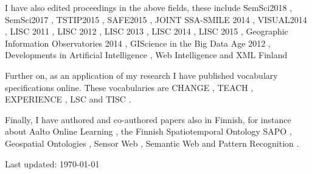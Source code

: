 \documentclass[11pt,letterpaper]{article}
\begin{document}
I have also edited proceedings in the above fields, these include SemSci2018 \cite{semsci2018},
SemSci2017 \cite{semsci2017}, TSTIP2015 \cite{tstip2015,tstip2015intro}, SAFE2015
\cite{safe-summary-2015}, JOINT SSA-SMILE 2014 \cite{joint-ssa2014-smile2014},
VISUAL2014 \cite{visual2014}, LISC 2011 \cite{lisc2011}, LISC 2012
\cite{lisc2012}, LISC 2013 \cite{lisc2013}, LISC 2014 \cite{lisc2014},
LISC 2015 \cite{lisc2015}, Geographic Information Observatories 2014
\cite{gio-2014-proc}, GIScience in the Big Data Age 2012 \cite{giscience-bigdata-2012}, Developments in Artificial Intelligence \cite{hyvonen-et-al-developments-in-artificial-intelligence-and-the-semantic-web-step-2006}, Web Intelligence
 			\cite{hyvonen-kauppinen-et-al-proceedings-of-the-2004}
 		and XML Finland
 			\cite{xml2005}

Further on, as an application of my research
I have published vocabulary specifications online. These vocabularies are CHANGE \cite{changevocab}, TEACH \cite{teachvocab},
EXPERIENCE \cite{experiencevocab}, LSC \cite{lscvocab} and TISC \cite{tiscvocab}.


Finally, I have authored and co-authored papers also in Finnish, for
instance about Aalto Online Learning \cite{aole-aikakauskirja-2017}, the Finnish
Spatiotemporal Ontology SAPO \cite{sapo-raportti}, Geospatial Ontologies \cite{henriksson-kauppinen-positio-2007}, Sensor Web \cite{havainnot-2013}, Semantic Web \cite{kauppinen-ruotsalo-salminen-tiedon-mallintaminen-2005} and Pattern Recognition
		\cite{hahmot-2003}.



\begin{center}
  \begin{footnotesize}
    Last updated: \today \\
  \end{footnotesize}
\end{center}



\end{document}
